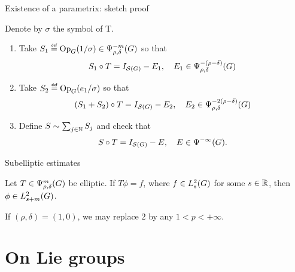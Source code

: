 \documentclass{beamer}
\begin{document}
\begin{frame}
    {Existence of a parametrix: sketch proof}

    \pause
    Denote by $\sigma$ the symbol of T.
    \begin{enumerate}
        \item Take $S_1 \defeq \Op(1 / \sigma) \in \OperatorClass {-m} {\rho, \delta}$ so that
            \begin{align*}
                S_1 \circ T = \Id {\Schwartz \Group} - E_1,
                \quad E_1 \in \OperatorClass {-(\rho - \delta)} {\rho, \delta}
            \end{align*}
            \pause
        \item Take $S_2 \defeq \Op(e_1/\sigma)$ so that
            \begin{align*}
                (S_1 + S_2) \circ T = \Id {\Schwartz \Group} - E_2,
                \quad E_2 \in \OperatorClass {-2(\rho - \delta)} {\rho, \delta}
            \end{align*}
            \pause
        \item Define $S \sim \sum_{j \in \mathbb{N}} S_j$ and check that
            \begin{align*}
                S \circ T = \Id {\Schwartz \Group} - E,
                \quad E \in \SmoothingOperators.
            \end{align*}
    \end{enumerate}
\end{frame}

\begin{frame}
    {Subelliptic estimates}

    \begin{theorem}
        Let $T \in \OperatorClass m {\rho, \delta}$ be elliptic.
        If $T \phi = f$,
        where $f \in \Sobolev s$ for some $s \in \mathbb{R}$,
        then $\phi \in \Sobolev {s + m}$.

        If $(\rho, \delta) = (1, 0)$,
        we may replace $2$ by any $1 < p < + \infty$.
    \end{theorem}
\end{frame}

\section{On Lie groups}

\renewcommand{\Group}{G}
\end{document}
